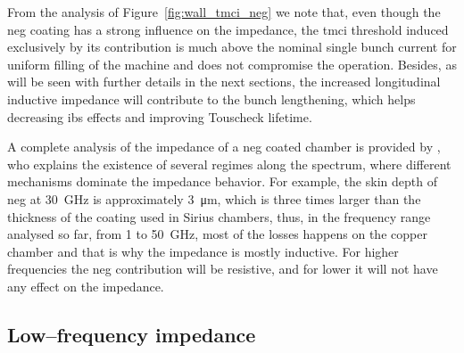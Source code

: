     From the analysis of Figure~\ref{fig:wall_tmci_neg} we note that, even though the \gls{neg} coating has a strong influence on the impedance, the \gls{tmci} threshold induced exclusively by its contribution is much above the nominal single bunch current for uniform filling of the machine and does not compromise the operation. Besides, as will be seen with further details in the next sections, the increased longitudinal inductive impedance will contribute to the bunch lengthening, which helps decreasing \gls{ibs} effects and improving Touscheck lifetime.

    A complete analysis of the impedance of a \gls{neg} coated chamber is provided by , who explains the existence of several regimes along the spectrum, where different mechanisms dominate the impedance behavior. For example, the skin depth of \gls{neg} at \SI{30}{\giga\hertz} is approximately \SI{3}{\micro\meter}, which is three times larger than the thickness of the coating used in Sirius chambers, thus, in the frequency range analysed so far, from \SI{1}{} to \SI{50}{\giga\hertz}, most of the losses happens on the copper chamber and that is why the impedance is mostly inductive. For higher frequencies the \gls{neg} contribution will be resistive, and for lower it will not have any effect on the impedance.

\subsection{Low--frequency impedance}

